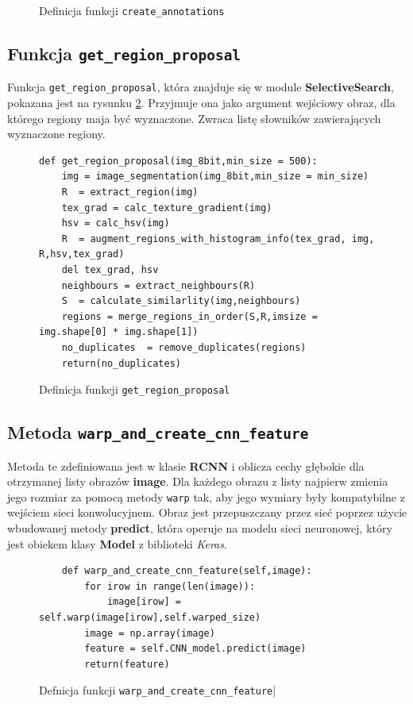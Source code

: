 \documentclass[a4paper,twoside,12pt]{book}
\begin{document}
{\begin{figure}[h!]
\begin{lstlisting}
\end{lstlisting}
\caption{Definicja funkcji \lstinline|create_annotations|}
\label{dataprep}
\end{figure}
\subsection{Funkcja \lstinline|get_region_proposal|}
 Funkcja \lstinline|get_region_proposal|, która znajduje się w module \textbf{SelectiveSearch}, pokazana jest na rysunku \ref{search}. Przyjmuje ona jako argument wejściowy obraz, dla którego regiony maja być wyznaczone. Zwraca listę słowników zawierających wyznaczone regiony.}
\begin{figure}[h!]
\centering
\begin{lstlisting}
def get_region_proposal(img_8bit,min_size = 500):
    img = image_segmentation(img_8bit,min_size = min_size)
    R  = extract_region(img)    
    tex_grad = calc_texture_gradient(img)
    hsv = calc_hsv(img)
    R  = augment_regions_with_histogram_info(tex_grad, img, R,hsv,tex_grad)
    del tex_grad, hsv
    neighbours = extract_neighbours(R)
    S  = calculate_similarlity(img,neighbours)
    regions = merge_regions_in_order(S,R,imsize = img.shape[0] * img.shape[1])
    no_duplicates  = remove_duplicates(regions)
    return(no_duplicates)
\end{lstlisting}
\caption{Definicja funkcji  \lstinline|get_region_proposal|}
\label{search}
\end{figure}

\subsection{Metoda \lstinline|warp_and_create_cnn_feature|}
{Metoda te zdefiniowana jest w klasie \textbf{RCNN} i oblicza cechy głębokie dla otrzymanej listy obrazów \textbf{image}. Dla każdego obrazu z listy najpierw zmienia jego rozmiar za pomocą metody \lstinline|warp| tak, aby jego wymiary były kompatybilne z wejściem sieci konwolucyjnem. Obraz jest przepuszczany przez sieć poprzez użycie wbudowanej metody \textbf{predict}, która operuje na modelu sieci neuronowej, który jest obiekem klasy \textbf{Model} z biblioteki \emph{Keras}. }
\begin{figure}[h!]
\centering
\begin{lstlisting}
    def warp_and_create_cnn_feature(self,image):
        for irow in range(len(image)):
            image[irow] = self.warp(image[irow],self.warped_size)
        image = np.array(image)
        feature = self.CNN_model.predict(image)
        return(feature)
\end{lstlisting}
\caption{Defnicja funkcji \lstinline|warp_and_create_cnn_feature||}
\label{warp}
\end{figure}
\end{document}
